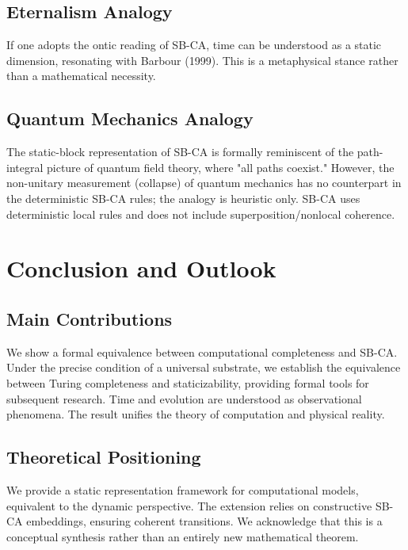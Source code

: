 \documentclass[12pt]{article}
\theoremstyle{plain}
\theoremstyle{definition}
\begin{document}
\subsection{Eternalism Analogy}

If one adopts the ontic reading of SB-CA, time can be understood as a static dimension, resonating with Barbour (1999)\cite{barbour1999}. This is a metaphysical stance rather than a mathematical necessity.

\subsection{Quantum Mechanics Analogy}

The static-block representation of SB-CA is formally reminiscent of the path-integral picture of quantum field theory, where "all paths coexist." However, the non-unitary measurement (collapse) of quantum mechanics has no counterpart in the deterministic SB-CA rules; the analogy is heuristic only. SB-CA uses deterministic local rules and does not include superposition/nonlocal coherence.

\section{Conclusion and Outlook}

\subsection{Main Contributions}

We show a formal equivalence between computational completeness and SB-CA. Under the precise condition of a universal substrate, we establish the equivalence between Turing completeness and staticizability, providing formal tools for subsequent research. Time and evolution are understood as observational phenomena. The result unifies the theory of computation and physical reality.

\subsection{Theoretical Positioning}

We provide a static representation framework for computational models, equivalent to the dynamic perspective. The extension relies on constructive SB-CA embeddings, ensuring coherent transitions. We acknowledge that this is a conceptual synthesis rather than an entirely new mathematical theorem.
\end{document}
